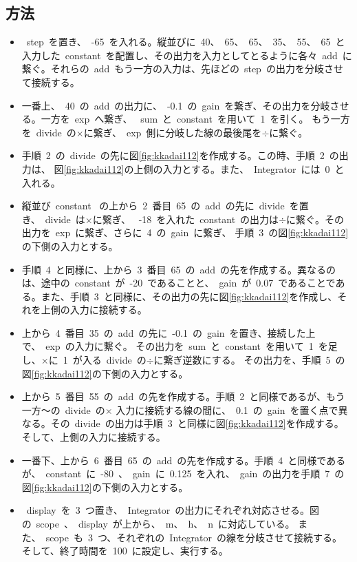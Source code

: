 \documentclass[10pt]{jarticle}
\begin{document}
\subsection{方法}
%
\begin{itemize}[left=0pt]
	\setlength{\leftskip}{1.5cm}
	\item[手順1 ] \ step\ を置き、\ -65\ を入れる。縦並びに\ 40、\ 65、\ 65、\ 35、\ 55、\ 65\ と入力した\ constant\ を配置し、その出力を入力としてとるように各々\ add\ 
		に繋ぐ。それらの\ add\ もう一方の入力は、先ほどの\ step\ の出力を分岐させて接続する。
	\item[手順2 ] 一番上、\ 40\ の\ add\ の出力に、\ -0.1\ の\ gain\ を繋ぎ、その出力を分岐させる。一方を\ exp\ へ繋ぎ、
		\ sum\ と\ constant\ を用いて\ 1\ を引く。
		もう一方を\ divide\ の$ \times $に繋ぎ、\ exp\ 側に分岐した線の最後尾を$ \div $に繋ぐ。
	\item[手順3 ] 手順\ 2\ の\ divide\ の先に図\ref{fig:kkadai112}を作成する。この時、手順\ 2\ の出力は、
		図\ref{fig:kkadai112}の上側の入力とする。また、\ Integrator\ には\ 0\ と入れる。
	\item[手順4 ] 縦並び\ constant \ の上から\ 2\ 番目\ 65\ の\ add\ の先に\ divide\ を置き、\ divide\ は$ \times $に繋ぎ、
		\ -18\ を入れた\ constant\ の出力は$ \div $に繋ぐ。その出力を\ exp\ に繋ぎ、さらに\ 4\ の\ gain\ に繋ぎ、
		手順\ 3\ の図\ref{fig:kkadai112}の下側の入力とする。
	\item[手順5 ] 手順\ 4\ と同様に、上から\ 3\ 番目\ 65\ の\ add\ の先を作成する。異なるのは、途中の\ constant\ が\ -20\ であることと、\ gain\ 
		が\ 0.07\ であることである。また、手順\ 3\ と同様に、その出力の先に図\ref{fig:kkadai112}を作成し、それを上側の入力に接続する。
	\item[手順6 ] 上から\ 4\ 番目\ 35\ の\ add\ の先に\ -0.1\ の\ gain\ を置き、接続した上で、\ exp\ の入力に繋ぐ。
		その出力を\ sum\ と\ constant\ を用いて\ 1\ を足し、$ \times $に\ 1\ が入る\ divide\ の$ \div $に繋ぎ逆数にする。
		その出力を、手順\ 5\ の図\ref{fig:kkadai112}の下側の入力とする。
	\item[手順7 ] 上から\ 5\ 番目\ 55\ の\ add\ の先を作成する。手順\ 2\ と同様であるが、もう一方～の\ divide\ の$ \times $
		入力に接続する線の間に、\ 0.1\ の\ gain\ を置く点で異なる。その\ divide\ の出力は手順\ 3\ と同様に図\ref{fig:kkadai112}を作成する。
		そして、上側の入力に接続する。
	\item[手順8 ] 一番下、上から\ 6\ 番目\ 65\ の\ add\ の先を作成する。手順\ 4\ と同様であるが、\ constant\ に\ -80\ 、\ gain\ 
		に\ 0.125\ を入れ、\ gain\ の出力を手順\ 7\ の図\ref{fig:kkadai112}の下側の入力とする。
	\item[手順9 ] \ display\ を\ 3\ つ置き、\ Integrator\ の出力にそれぞれ対応させる。図の\ scope\ 、\ display\ が上から、\ m、\ h、\ n\ に対応している。
		また、\ scope\ も\ 3\ つ、それぞれの\ Integrator\ の線を分岐させて接続する。
		そして、終了時間を\ 100\ に設定し、実行する。
\end{itemize}
\end{document}
